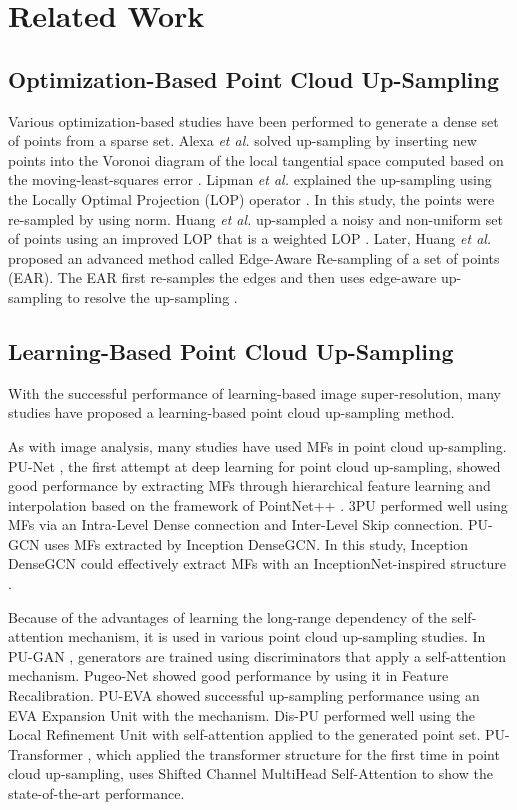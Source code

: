 \documentclass{article}
\begin{document}
\section{Related Work}
\label{sec:related_works}
\subsection{Optimization-Based Point Cloud Up-Sampling}
\quad Various optimization-based studies have been performed to generate a dense set of points from a sparse set. Alexa \textit{et al.} solved up-sampling by inserting new points into the Voronoi diagram of the local tangential space computed based on the moving-least-squares error \cite{alexa2003computing}. Lipman \textit{et al.} explained the up-sampling using the Locally Optimal Projection (LOP) operator \cite{lipman2007parameterization}. In this study, the points were re-sampled by using  norm. Huang \textit{et al.} up-sampled a noisy and non-uniform set of points using an improved LOP that is a weighted LOP \cite{huang2009consolidation}. Later, Huang \textit{et al.} proposed an advanced method called Edge-Aware Re-sampling of a set of points (EAR). The EAR first re-samples the edges and then uses edge-aware up-sampling to resolve the up-sampling \cite{huang2013edge}.

\subsection{Learning-Based Point Cloud Up-Sampling}
\quad With the successful performance of learning-based image super-resolution, many studies have proposed a learning-based point cloud up-sampling method.

\quad As with image analysis, many studies have used MFs in point cloud up-sampling. PU-Net \cite{yu2018pu}, the first attempt at deep learning for point cloud up-sampling, showed good performance by extracting MFs through hierarchical feature learning and interpolation based on the framework of PointNet++ \cite{qi2017pointnet++}. 3PU \cite{yifan2019patch} performed well using MFs via an Intra-Level Dense connection and Inter-Level Skip connection. PU-GCN \cite{qian2021pu} uses MFs extracted by Inception DenseGCN. In this study, Inception DenseGCN could effectively extract MFs with an InceptionNet-inspired structure \cite{szegedy2015going}.

\quad Because of the advantages of learning the long-range dependency of the self-attention mechanism, it is used in various point cloud up-sampling studies. In PU-GAN \cite{li2019pu}, generators are trained using discriminators that apply a self-attention mechanism. Pugeo-Net \cite{qian2020pugeo} showed good performance by using it in Feature Recalibration. PU-EVA \cite{luo2021pu} showed successful up-sampling performance using an EVA Expansion Unit with the mechanism. Dis-PU \cite{li2021point} performed well using the Local Refinement Unit with self-attention applied to the generated point set. PU-Transformer \cite{qiu2021pu}, which applied the transformer structure for the first time in point cloud up-sampling, uses Shifted Channel MultiHead Self-Attention to show the state-of-the-art performance.
\end{document}
